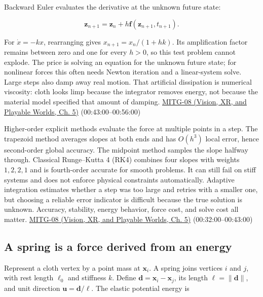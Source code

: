Backward Euler evaluates the derivative at the unknown future state:

\[
\boldsymbol{z}_{n+1}=\boldsymbol{z}_n+h\boldsymbol{f}(\boldsymbol{z}_{n+1},t_{n+1}).
\]

For \(\dot{x}=-kx\), rearranging gives \(x_{n+1}=x_n/(1+hk)\). Its amplification factor remains between zero and one for every \(h>0\), so this test problem cannot explode. The price is solving an equation for the unknown future state; for nonlinear forces this often needs Newton iteration and a linear-system solve. Large steps also damp away real motion. That artificial dissipation is numerical viscosity: cloth looks limp because the integrator removes energy, not because the material model specified that amount of damping. \href{../07-Vision-XR-and-Playable-Worlds/main.pdf\#nameddest=04-visual-computing-ii-ch036-mitg-08---cloth-simulation}{MITG-08 (Vision, XR, and Playable Worlds, Ch. 5)} (00:43:00--00:56:00)

Higher-order explicit methods evaluate the force at multiple points in a step. The trapezoid method averages slopes at both ends and has \(O(h^3)\) local error, hence second-order global accuracy. The midpoint method samples the slope halfway through. Classical Runge--Kutta 4 (RK4) combines four slopes with weights \(1,2,2,1\) and is fourth-order accurate for smooth problems. It can still fail on stiff systems and does not enforce physical constraints automatically. Adaptive integration estimates whether a step was too large and retries with a smaller one, but choosing a reliable error indicator is difficult because the true solution is unknown. Accuracy, stability, energy behavior, force cost, and solve cost all matter. \href{../07-Vision-XR-and-Playable-Worlds/main.pdf\#nameddest=04-visual-computing-ii-ch036-mitg-08---cloth-simulation}{MITG-08 (Vision, XR, and Playable Worlds, Ch. 5)} (00:32:00--00:43:00)

\subsection{A spring is a force derived from an energy}\label{04-visual-computing-ii-ch029-a-spring-is-a-force-derived-from-an-energy}

\hypertarget{04-visual-computing-ii-ch029-a-spring-is-a-force-derived-from-an-energy}{}

Represent a cloth vertex by a point mass at \(\boldsymbol{x}_i\). A spring joins vertices \(i\) and \(j\), with rest length \(\ell_0\) and stiffness \(k\). Define \(\boldsymbol{d}=\boldsymbol{x}_i-\boldsymbol{x}_j\), its length \(\ell=\|\boldsymbol{d}\|\), and unit direction \(\boldsymbol{u}=\boldsymbol{d}/\ell\). The elastic potential energy is


